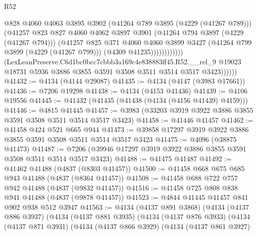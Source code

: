 \begin{lexlean}{R52}
\begin{coremodule}
                                @828
                                @4060
                                @4063
                                @3895
                                @3902
                                (@41264 @789 @3895 (@4229 (@41267 @789)))
                                (@41257
                                  @823
                                  @827
                                  @4060
                                  @4062
                                  @3897
                                  @3901
                                  (@41264 @794 @3897 (@4229 (@41267 @794)))
                                  (@41257
                                    @825
                                    @371
                                    @4060
                                    @4060
                                    @3899
                                    @3427
                                    (@41264 @799 @3899 (@4229 (@41267 @799)))
                                    (@4309 @41235))))))))))))
              (LexLeanPreserve.C6d1bc0bcc7cbbb3a169c4e838883ff45.R52.__rel_9
                @19023
                @18731
                @5936
                @3886
                @3855
                @3591
                @3508
                @3511
                @3514
                @3517
                @3423))))))
@41432 := @4134 (@4144 @29087)
@41435 := @4134 (@4147 (@3983 @17661))
@41436 := @7206 @19298
@41438 := @4134 (@4153 @41436)
@41439 := @4106 @19556
@41445 := @41432 (@41435 (@41438 (@4134 (@4156 @41439) @4159)))
@41446 := @4815 @41445
@41457 := @3983 (@33203 @3919 @3922 @3886 @3855 @3591 @3508 @3511 @3514 @3517 @3423)
@41458 := @41446 @41457
@41462 := @41458 @424 @521 @665 @944
@41473 := @39858 @17297 @3919 @3922 @3886 @3855 @3591 @3508 @3511 @3514 @3517 @3423
@41475 := @4096 (@38875 @41473)
@41487 := @7206 (@39946 @17297 @3919 @3922 @3886 @3855 @3591 @3508 @3511 @3514 @3517 @3423)
@41488 := @41475 @41487
@41492 := @41462 @41488 (@4837 (@8303 @41457))
@41500 := @41458 @668 @675 @685 @943 @41488 (@4837 (@8364 @41457))
@41508 := @41458 @688 @722 @757 @942 @41488 (@4837 (@9832 @41457))
@41516 := @41458 @725 @808 @838 @941 @41488 (@4837 (@9878 @41457))
@41523 := @4844 @41445 @41457 @841 @902 @938 @512 @3947
@41563 := @4134
    (@4137 @891 @3868)
    (@4134
      (@4137 @886 @3937)
      (@4134
        (@4137 @881 @3935)
        (@4134
          (@4137 @876 @3933)
          (@4134
            (@4137 @871 @3931)
            (@4134
              (@4137 @866 @3929)
              (@4134
                (@4137 @861 @3927)

\end{coremodule}
\end{lexlean}

